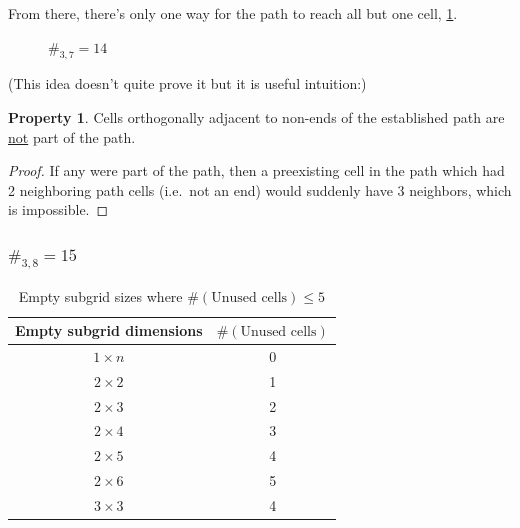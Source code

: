 \documentclass{article}
\newcommand{\highlight}[1]{\uline{#1}}
\theoremstyle{definition}%
\newtheorem{property}[theorem]{Property}
\begin{document}
From there, there's only one way for the path to reach all but one cell, \cref{fig:3x7}.
\begin{figure}[htbp!]
    \centering
    \caption{$\#_{3,7} = 14$}
    \label{fig:3x7}
\end{figure}

(This idea doesn't quite prove it but it is useful intuition:)
\begin{property}
Cells orthogonally adjacent to non-ends of the established path are \highlight{not} part of the path.
\end{property}
\begin{proof}
If any were part of the path, then a preexisting cell in the path which had 2 neighboring path cells (i.e.\ not an end) would suddenly have 3 neighbors, which is impossible.
\end{proof}

\subsubsection{$\#_{3,8} = 15$}

\begin{table}
\centering
\begin{tabular}{cc}
\toprule
Empty subgrid dimensions & $\#(\text{Unused cells})$ \\
\midrule
$1 \times n$ & 0 \\
\midrule
$2 \times 2$ & 1 \\
$2 \times 3$ & 2 \\
$2 \times 4$ & 3 \\
$2 \times 5$ & 4 \\
$2 \times 6$ & 5 \\
\midrule
$3 \times 3$ & 4 \\
\bottomrule
\end{tabular}
\caption{Empty subgrid sizes where $\#(\text{Unused cells}) \le 5$}
\label{tab:emun}
\end{table}
\end{document}

